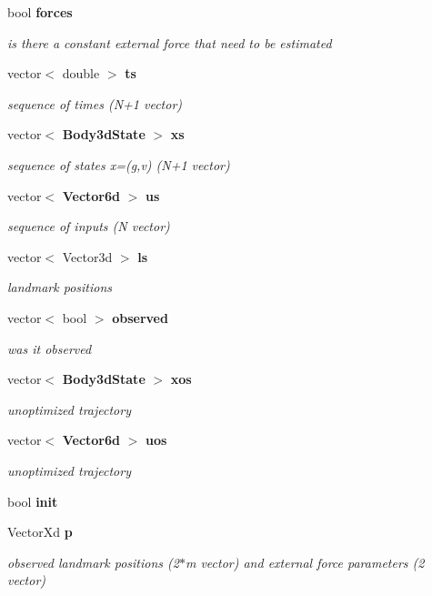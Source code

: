 \begin{DoxyCompactItemize}
bool {\bf forces}
\begin{DoxyCompactList}\small\item\em is there a constant external force that need to be estimated \end{DoxyCompactList}\item 
vector$<$ double $>$ {\bf ts}
\begin{DoxyCompactList}\small\item\em sequence of times (\-N+1 vector) \end{DoxyCompactList}\item 
vector$<$ {\bf \-Body3d\-State} $>$ {\bf xs}
\begin{DoxyCompactList}\small\item\em sequence of states x=(g,v) (\-N+1 vector) \end{DoxyCompactList}\item 
vector$<$ {\bf \-Vector6d} $>$ {\bf us}
\begin{DoxyCompactList}\small\item\em sequence of inputs (\-N vector) \end{DoxyCompactList}\item 
vector$<$ \-Vector3d $>$ {\bf ls}
\begin{DoxyCompactList}\small\item\em landmark positions \end{DoxyCompactList}\item 
vector$<$ bool $>$ {\bf observed}
\begin{DoxyCompactList}\small\item\em was it observed \end{DoxyCompactList}\item 
vector$<$ {\bf \-Body3d\-State} $>$ {\bf xos}
\begin{DoxyCompactList}\small\item\em unoptimized trajectory \end{DoxyCompactList}\item 
vector$<$ {\bf \-Vector6d} $>$ {\bf uos}
\begin{DoxyCompactList}\small\item\em unoptimized trajectory \end{DoxyCompactList}\item 
bool {\bf init}
\item 
\-Vector\-Xd {\bf p}
\begin{DoxyCompactList}\small\item\em observed landmark positions (2$\ast$m vector) and external force parameters (2 vector) \end{DoxyCompactList}\item 

\end{DoxyCompactItemize}
